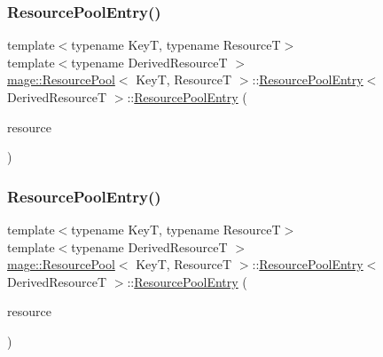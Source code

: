 \subsubsection{\texorpdfstring{Resource\+Pool\+Entry()}{ResourcePoolEntry()}\hspace{0.1cm}{\footnotesize\ttfamily [2/3]}}
{\footnotesize\ttfamily template$<$typename KeyT, typename ResourceT$>$ \\
template$<$typename Derived\+ResourceT $>$ \\
\hyperlink{classmage_1_1_resource_pool}{mage\+::\+Resource\+Pool}$<$ KeyT, ResourceT $>$\+::\hyperlink{structmage_1_1_resource_pool_1_1_resource_pool_entry}{Resource\+Pool\+Entry}$<$ Derived\+ResourceT $>$\+::\hyperlink{structmage_1_1_resource_pool_1_1_resource_pool_entry}{Resource\+Pool\+Entry} (\begin{DoxyParamCaption}\item[{const \hyperlink{structmage_1_1_resource_pool_1_1_resource_pool_entry}{Resource\+Pool\+Entry}$<$ Derived\+ResourceT $>$ \&}]{resource }\end{DoxyParamCaption})\hspace{0.3cm}{\ttfamily [delete]}}

\hypertarget{structmage_1_1_resource_pool_1_1_resource_pool_entry_a7e97168b2d81c76dd6dbd6d7037a6243}{}\label{structmage_1_1_resource_pool_1_1_resource_pool_entry_a7e97168b2d81c76dd6dbd6d7037a6243} 
\subsubsection{\texorpdfstring{Resource\+Pool\+Entry()}{ResourcePoolEntry()}\hspace{0.1cm}{\footnotesize\ttfamily [3/3]}}
{\footnotesize\ttfamily template$<$typename KeyT, typename ResourceT$>$ \\
template$<$typename Derived\+ResourceT $>$ \\
\hyperlink{classmage_1_1_resource_pool}{mage\+::\+Resource\+Pool}$<$ KeyT, ResourceT $>$\+::\hyperlink{structmage_1_1_resource_pool_1_1_resource_pool_entry}{Resource\+Pool\+Entry}$<$ Derived\+ResourceT $>$\+::\hyperlink{structmage_1_1_resource_pool_1_1_resource_pool_entry}{Resource\+Pool\+Entry} (\begin{DoxyParamCaption}\item[{\hyperlink{structmage_1_1_resource_pool_1_1_resource_pool_entry}{Resource\+Pool\+Entry}$<$ Derived\+ResourceT $>$ \&\&}]{resource }\end{DoxyParamCaption})\hspace{0.3cm}{\ttfamily [delete]}}

